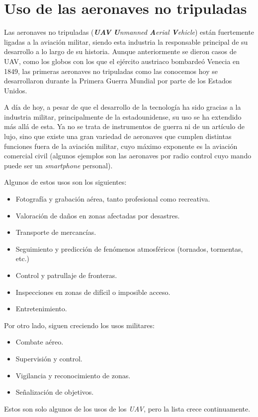 \section{Uso de las aeronaves no tripuladas}
Las aeronaves no tripuladas (\emph{\textbf{UAV} \textbf{U}nmanned \textbf{A}erial \textbf{V}ehicle}) están fuertemente ligadas a la aviación militar, siendo esta industria la responsable principal de su desarrollo a lo largo de su historia.
Aunque anteriormente se dieron casos de UAV, como los globos con los que el ejército austriaco bombardeó Venecia en 1849, las primeras aeronaves no tripuladas como las conocemos hoy se desarrollaron durante la Primera Guerra Mundial por parte de los Estados Unidos.

A día de hoy, a pesar de que el desarrollo de la tecnología ha sido gracias a la industria militar, principalmente de la estadounidense, su uso se ha extendido más allá de esta. Ya no se trata de instrumentos de guerra ni de un artículo de lujo, sino que existe una gran variedad de aeronaves que cumplen distintas funciones fuera de la aviación militar, cuyo máximo exponente es la aviación comercial civil (algunos ejemplos son las aeronaves por radio control cuyo mando puede ser un \emph{smartphone} personal).

Algunos de estos usos son los siguientes:
\begin{itemize}
	\item Fotografía y grabación aérea, tanto profesional como recreativa.
	\item Valoración de daños en zonas afectadas por desastres.
	\item Transporte de mercancías.
	\item Seguimiento y predicción de fenómenos atmosféricos (tornados, tormentas, etc.)
	\item Control y patrullaje de fronteras.
	\item Inspecciones en zonas de difícil o imposible acceso.
	\item Entretenimiento.
\end{itemize}

Por otro lado, siguen creciendo los usos militares:
\begin{itemize}
	\item Combate aéreo.
	\item Supervisión y control.
	\item Vigilancia y reconocimiento de zonas.
	\item Señalización de objetivos.
\end{itemize}
Estos son solo algunos de los usos de los \emph{UAV}, pero la lista crece continuamente.

